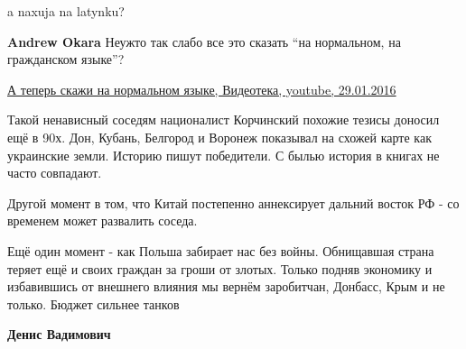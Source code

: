 \begin{itemize}
a naxuja na latynku?

\begin{itemize}
 
\textbf{Andrew Okara} Неужто так слабо все это сказать \enquote{на нормальном, на гражданском языке}?

\href{https://www.youtube.com/watch?v=PvR9_cmZtck}{%
А теперь скажи на нормальном языке, Видеотека, youtube, 29.01.2016%
}

\end{itemize}

 



 

Такой ненависный соседям националист Корчинский похожие тезисы доносил ещё в
90х. Дон, Кубань, Белгород и Воронеж показывал на схожей карте как украинские
земли. Историю пишут победители. С былью история в книгах не часто совпадают.

Другой момент в том, что Китай постепенно аннексирует дальний восток РФ - со
временем может развалить соседа.

Ещё один момент - как Польша забирает нас без войны. Обнищавшая страна теряет
ещё и своих граждан за гроши от злотых. Только подняв экономику и избавившись
от внешнего влияния мы вернём заробитчан, Донбасс, Крым и не только. Бюджет
сильнее танков

\begin{itemize}
 
\textbf{Денис Вадимович} 


\end{itemize}
\end{itemize}
